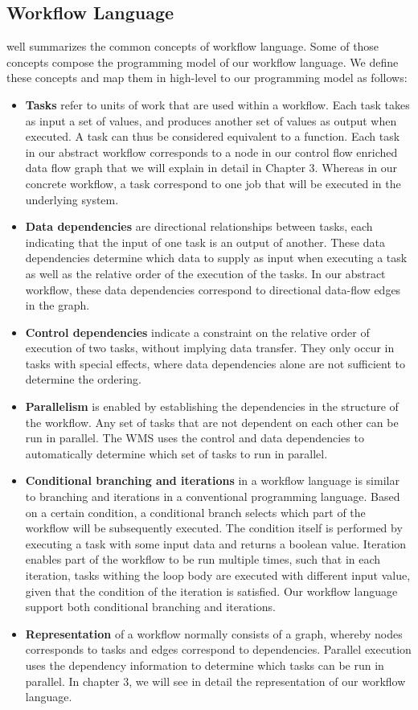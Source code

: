 \subsection{Workflow Language}
\cite{kelly2011applying} well summarizes the common concepts of workflow language. Some of those concepts compose the programming model of our workflow language. We define these concepts and map them in high-level to our programming model as follows:
\begin{itemize}
\item \textbf{Tasks} refer to units of work that are used within a workflow. Each task takes as input a set of values, and produces another set of values as output when executed. A task can thus be considered equivalent to a function. Each task in our abstract workflow corresponds to a node in our control flow enriched data flow graph that we will explain in detail in Chapter 3. Whereas in our concrete workflow, a task correspond to one job that will be executed in the underlying system. 
\item \textbf{Data dependencies} are directional relationships between tasks, each indicating that the input of one task is an output of another. These data dependencies determine which data to supply as input when executing a task as well as the relative order of the execution of the tasks. In our abstract workflow, these data dependencies correspond to directional data-flow edges in the graph. 
\item \textbf{Control dependencies} indicate a constraint on the relative order of execution of two tasks, without implying data transfer. They only occur in tasks with special effects, where data dependencies alone are not sufficient to determine the ordering.
\item \textbf{Parallelism} is enabled by establishing the dependencies in the structure of the workflow. Any set of tasks that are not dependent on each other can be run in parallel. The WMS uses the control and data dependencies to automatically determine which set of tasks to run in parallel. 
\item \textbf{Conditional branching and iterations} in a workflow language is similar to branching and iterations in a conventional programming language. Based on a certain condition, a conditional branch selects which part of the workflow will be subsequently executed. The condition itself is performed by executing a task with some input data and returns a boolean value. Iteration enables part of the workflow to be run multiple times, such that in each iteration, tasks withing the loop body are executed with different input value, given that the condition of the iteration is satisfied. Our workflow language support both conditional branching and iterations. 
\item \textbf{Representation} of a workflow normally consists of a graph, whereby nodes corresponds to tasks and edges correspond to dependencies. Parallel execution uses the dependency information to determine which tasks can be run in parallel. In chapter 3, we will see in detail the representation of our workflow language. 
\end{itemize} 


